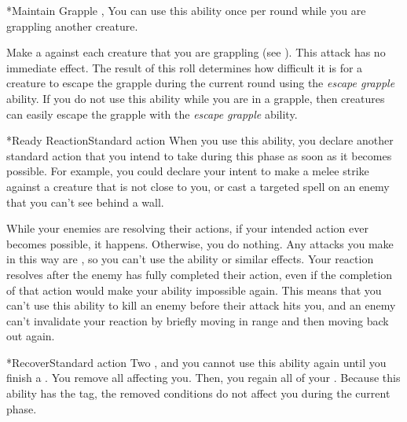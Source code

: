   \begin{activeability}*{Maintain Grapple}{}
    \abilitytags {}, 
    \rankline
    You can use this ability once per round while you are grappling another creature.

    Make a  against each creature that you are grappling (see ).
    This attack has no immediate effect.
    The result of this roll determines how difficult it is for a creature to escape the grapple during the current round using the \textit{escape grapple} ability.
    If you do not use this ability while you are in a grapple, then creatures can easily escape the grapple with the \textit{escape grapple} ability.
  \end{activeability}

  \begin{activeability}*{Ready Reaction}{Standard action}
    \abilitytags \atSwift
    \rankline
    When you use this ability, you declare another standard action that you intend to take during this phase as soon as it becomes possible.
    For example, you could declare your intent to make a melee strike against a creature that is not close to you, or cast a targeted spell on an enemy that you can't see behind a wall.

    While your enemies are resolving their actions, if your intended action ever becomes possible, it happens.
    Otherwise, you do nothing.
    Any attacks you make in this way are , so you can't use the  ability or similar effects.
    Your reaction resolves after the enemy has fully completed their action, even if the completion of that action would make your ability impossible again.
    This means that you can't use this ability to kill an enemy before their attack hits you, and an enemy can't invalidate your reaction by briefly moving in range and then moving back out again.
  \end{activeability}

  \begin{activeability}*{Recover}{Standard action}
    \abilitytags {}
    \abilitycost Two , and you cannot use this ability again until you finish a .
    \rankline
    You remove all  affecting you.
    Then, you regain all of your .
    Because this ability has the  tag, the removed conditions do not affect you during the current phase.
  \end{activeability}

